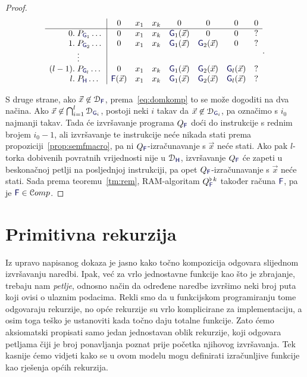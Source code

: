 \begin{proof}
\begin{equation}
\begin{array}{r@{\;}l|ccccccc}
      &               & 0          &x_1  &x_k    &0             &0             &0             &0            \\\hline
0.    &P_{\f G_1}\dots& 0          &x_1  &x_k    &\f G_1(\vec x)&0             &0             &?            \\
1.    &P_{\f G_2}\dots& 0          &x_1  &x_k    &\f G_1(\vec x)&\f G_2(\vec x)&0             &?            \\
      &\vdots                                                                                               \\
(l-1).&P_{\f G_l}\dots& 0          &x_1  &x_k    &\f G_1(\vec x)&\f G_2(\vec x)&\f G_l(\vec x)&?            \\
l.    &P_{\f H}\dots  &\f F(\vec x)&x_1  &x_k    &\f G_1(\vec x)&\f G_2(\vec x)&\f G_l(\vec x)&?
    \end{array}\text.
\end{equation}

S druge strane, ako $\vec x\not\in\dom{\f F}$, prema~\eqref{eq:domkomp} to se može dogoditi na dva načina. Ako $\vec x\not\in\bigcap_{i=1}^l\dom{\f G_i}$, postoji neki $i$ takav da $\vec x\not\in\dom{\f G_i}$, pa označimo s $i_0$ najmanji takav. Tada će izvršavanje programa $Q_{\f F}$ doći do instrukcije s rednim brojem $i_0-1$, ali izvršavanje te instrukcije neće nikada stati prema propoziciji~\ref{prop:semfmacro}, pa ni $Q_{\f F}$-izračunavanje s $\vec x$ neće stati. Ako pak $l$-torka dobivenih povratnih vrijednosti nije u $\dom{\f H}$, izvršavanje $Q_{\f F}$ će zapeti u beskonačnoj petlji na posljednjoj instrukciji, pa opet $Q_{\f F}$-izračunavanje s $\vec x$ neće stati.
Sada prema teoremu~\ref{tm:rem}, RAM-algoritam $Q_{\f F}^{\flat\,k}$ također računa $\f F$, pa je $\f F\in\mathcal Comp$.
\end{proof}

\section{Primitivna rekurzija}

Iz upravo napisanog dokaza je jasno kako točno kompozicija odgovara slijednom iz\-vrša\-va\-nju naredbi. Ipak, već za vrlo jednostavne funkcije kao što je zbrajanje, trebaju nam \emph{petlje}, odnosno način da određene naredbe izvršimo neki broj puta koji ovisi o ulaznim podacima. Rekli smo da u funkcijskom programiranju tome odgovaraju rekurzije, no opće rekurzije su vrlo komplicirane za implementaciju, a osim toga teško je ustanoviti kada točno daju totalne funkcije. Zato ćemo aksiomatski propisati samo jedan  jednostavan oblik rekurzije, koji odgovara petljama čiji je broj ponavljanja poznat prije početka njihovog izvršavanja. Tek kasnije ćemo vidjeti kako se u ovom modelu mogu definirati izračunljive funkcije kao rješenja općih rekurzija.

